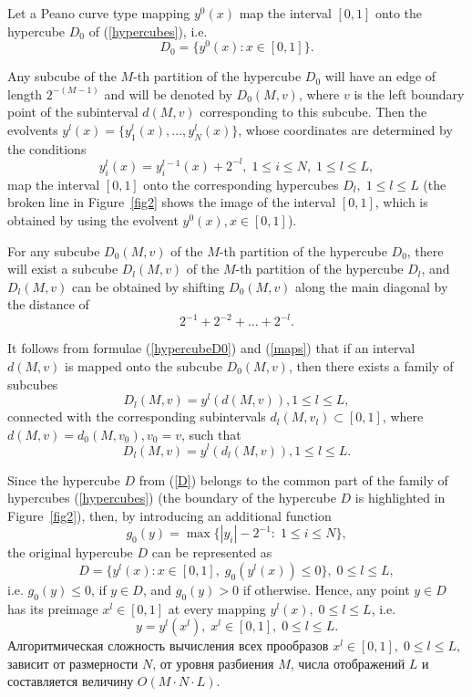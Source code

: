 \documentclass[entropy,article,submit,moreauthors,pdftex]{Definitions/mdpi}
\begin{document}
Let a Peano curve type mapping $y^0(x)$ map the interval $[0,1]$ onto the hypercube $D_0$ of (\ref{hypercubes}), i.e.
\begin{equation}\label{hypercubeD0}
D_0 = \{y^0(x): x \in [0, 1] \}.
\end{equation} 

Any subcube of the $M$-th partition of the hypercube $D_0$ will have an edge of length $2^{-(M-1)}$ and will be denoted by $D_0(M, v)$, where $v$ is the left boundary point of the subinterval $d(M, v)$ corresponding to this subcube. Then the evolvents $y^l(x)=\{y_1^l(x), ..., y_N^l(x)\}$, whose coordinates are determined by the conditions
\begin{equation}\label{maps}
y_i^l(x) = y_i^{l-1}(x) + 2^{-l}, \; 1 \leq i \leq N, \; 1 \leq l \leq L,
\end{equation} 
map the interval $[0,1]$ onto the corresponding hypercubes  $D_l, \; 1 \leq l \leq L$ (the broken line in Figure~\ref{fig2} shows the image of the interval $[0,1]$, which is obtained by using the evolvent $y^0(x), x \in [0,1]$).

For any subcube $D_0(M,v)$ of the $M$-th partition of the hypercube $D_0$, there will exist a subcube $D_l(M,v)$ of the $M$-th partition of the hypercube $D_l$, and $D_l(M,v)$ can be obtained by shifting $D_0(M,v)$ along the main diagonal by the distance of 
\[
2^{-1}+2^{-2}+...+2^{-l}.
\] 

It follows from formulae (\ref{hypercubeD0}) and (\ref{maps}) that if an interval $d(M,v)$ is mapped onto the subcube $D_0(M,v)$, then there exists a family of subcubes
\[
D_l(M,v) = y^l(d(M,v)), 1 \leq l \leq L,
\]
connected with the corresponding subintervals $d_l(M,v_l) \subset [0,1]$, where $d(M,v) = d_0(M,v_0), v_0 = v$, such that 
\[
D_l(M,v) = y^l(d_l(M,v)), 1 \leq l \leq L.
\] 

Since the hypercube $D$ from (\ref{D}) belongs to the common part of the family of hypercubes (\ref{hypercubes}) (the boundary of the hypercube $D$ is highlighted in Figure~\ref{fig2}), then, by introducing an additional function 
\[
g_0(y) = \max \{ |y_i|-2^{-1}: \; 1 \leq i \leq N \},
\] 
the original hypercube $D$ can be represented as
\[
D = \{y^l(x): x \in [0,1], \; g_0(y^l(x)) \leq 0 \}, \; 0 \leq l \leq L,
\] 
i.e. $g_0(y) \leq 0$, if $y \in D$, and $g_0(y) > 0$ if otherwise. Hence, any point $y \in D$ has its preimage $x^l \in [0,1]$ at every mapping $y^l(x), \; 0 \leq l \leq L$, i.e.
\[
y = y^l(x^l), \; x^l \in [0, 1], \; 0 \leq l \leq L.
\] 
Алгоритмическая сложность вычисления всех прообразов $x^l \in [0, 1], \; 0 \leq l \leq L,$ зависит от размерности $N$, от уровня разбиения $M$, числа отображений $L$ и составляется величину $O(M\cdot N \cdot L)$.
\end{document}
